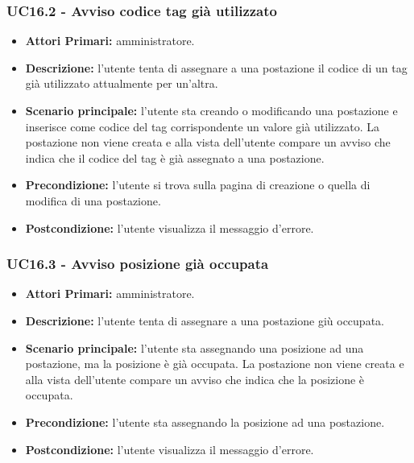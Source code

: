 \subsubsection{UC16.2 - Avviso codice tag già utilizzato}
\begin{itemize}
	\item\textbf{Attori Primari:}
	amministratore.
	\item\textbf{Descrizione:}
	l'utente tenta di assegnare a una postazione il codice di un tag già utilizzato attualmente per un'altra.
	\item\textbf{Scenario principale:}
	l'utente sta creando o modificando una postazione e inserisce come codice del tag corrispondente un valore già utilizzato.
	La postazione non viene creata e alla vista dell'utente compare un avviso che indica che il codice del tag è già assegnato a una postazione.
	\item\textbf{Precondizione:}
	l'utente si trova sulla pagina di creazione o quella di modifica di una postazione.
	\item\textbf{Postcondizione:}
	l'utente visualizza il messaggio d'errore.
\end{itemize}

\subsubsection{UC16.3 - Avviso posizione già occupata}
\begin{itemize}
	\item\textbf{Attori Primari:}
	amministratore.
	\item\textbf{Descrizione:}
	l'utente tenta di assegnare a una postazione giù occupata.
	\item\textbf{Scenario principale:}
	l'utente sta assegnando una posizione ad una postazione, ma la posizione è già occupata.
	La postazione non viene creata e alla vista dell'utente compare un avviso che indica che la posizione è occupata.
	\item\textbf{Precondizione:}
	l'utente sta assegnando la posizione ad una postazione.
	\item\textbf{Postcondizione:}
	l'utente visualizza il messaggio d'errore.
\end{itemize}

